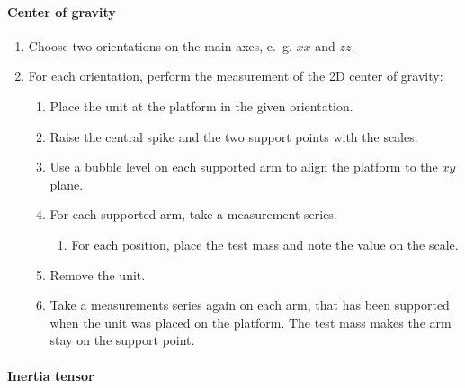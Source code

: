 \documentclass[journal]{IEEEtran}
\begin{document}
\paragraph{Center of gravity}
\begin{enumerate}
	\item Choose two orientations on the main axes, e.~g. $xx$ and $zz$.
	\item For each orientation, perform the measurement of the 2D center of gravity:
		\begin{enumerate}
			\item Place the unit at the platform in the given orientation.
			\item Raise the central spike and the two support points with the scales.
			\item Use a bubble level on each supported arm to align the platform to the $xy$ plane.
			\item For each supported arm, take a measurement series.
				\begin{enumerate}
					\item For each position, place the test mass and note the value on the scale.
				\end{enumerate}
			\item Remove the unit.
			\item Take a measurements series again on each arm, that has been supported when the unit was placed on the platform. The test mass makes the arm stay on the support point.
		\end{enumerate}
\end{enumerate}

\paragraph{Inertia tensor}
\end{document}
